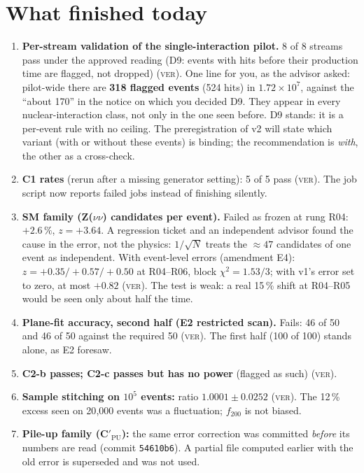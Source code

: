 \documentclass[11pt,a4paper]{article}
\newcommand{\ver}{\textsc{ver}}
\begin{document}
\section{What finished today}
\begin{enumerate}
\item \textbf{Per-stream validation of the single-interaction pilot.} 8 of 8 streams pass under the approved
      reading (D9: events with hits before their production time are flagged, not dropped) (\ver). One line for
      you, as the advisor asked: pilot-wide there are \textbf{318 flagged events} (524 hits) in
      $1.72\times10^{7}$, against the ``about 170'' in the notice on which you decided D9. They appear in every
      nuclear-interaction class, not only in the one seen before. D9 stands: it is a per-event rule with no
      ceiling. The preregistration of v2 will state which variant (with or without these events) is binding;
      the recommendation is \emph{with}, the other as a cross-check.
\item \textbf{C1 rates} (rerun after a missing generator setting): 5 of 5 pass (\ver). The job script now
      reports failed jobs instead of finishing silently.
\item \textbf{SM family (Z($\nu\nu$) candidates per event).} Failed as frozen at rung R04: $+2.6\,\%$,
      $z=+3.64$. A regression ticket and an independent advisor found the cause in the error, not the physics:
      $1/\sqrt{N}$ treats the $\approx47$ candidates of one event as independent. With event-level errors
      (amendment E4): $z=+0.35/+0.57/+0.50$ at R04--R06, block $\chi^2=1.53/3$; with v1's error set to zero,
      at most $+0.82$ (\ver). The test is weak: a real 15\,\% shift at R04--R05 would be seen only about half the
      time.
\item \textbf{Plane-fit accuracy, second half (E2 restricted scan).} Fails: 46 of 50 and 46 of 50 against the
      required 50 (\ver). The first half (100 of 100) stands alone, as E2 foresaw.
\item \textbf{C2-b passes; C2-c passes but has no power} (flagged as such) (\ver).
\item \textbf{Sample stitching on $10^{5}$ events:} ratio $1.0001\pm0.0252$ (\ver). The 12\,\% excess seen
      on 20{,}000 events was a fluctuation; $f_{200}$ is not biased.
\item \textbf{Pile-up family (C$'_{\mathrm{PU}}$):} the same error correction was committed \emph{before} its
      numbers are read (commit \texttt{54610b6}). A partial file computed earlier with the old error is
      superseded and was not used.
\end{enumerate}
\end{document}
